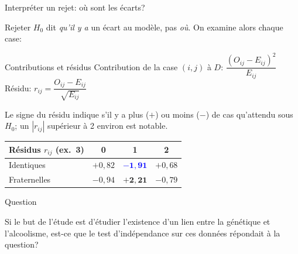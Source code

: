 \documentclass{BeamerTemplate}
\begin{document}
\begin{frame}[t]{Interpréter un rejet: où sont les écarts?}

\small
Rejeter $H_0$ dit \emph{qu'il y a} un écart au modèle, pas \emph{où}. On examine
alors chaque case:

\begin{Boite}{Contributions et résidus}
\alert{Contribution} de la case $(i,j)$ à $D$: $\dfrac{(O_{ij}-E_{ij})^2}{E_{ij}}$
\qquad \alert{Résidu}: $r_{ij}=\dfrac{O_{ij}-E_{ij}}{\sqrt{E_{ij}}}$
\end{Boite}

Le \alert{signe} du résidu indique s'il y a plus ($+$) ou moins ($-$) de cas
qu'attendu sous $H_0$; un $|r_{ij}|$ supérieur à 2 environ est notable.

\vspace{-1mm}
\begin{center}
\renewcommand{\arraystretch}{1.1}
\begin{tabular}{l|ccc}
Résidus $r_{ij}$ (ex.\ 3) & 0 & 1 & 2\\
\hline
Identiques & $+0{,}82$ & \textcolor{blue}{$\mathbf{-1{,}91}$} & $+0{,}68$\\
Fraternelles & $-0{,}94$ & \textcolor{burntorange}{$\mathbf{+2{,}21}$} & $-0{,}79$\\
\end{tabular}
\end{center}

\vspace{-1mm}

\end{frame}

\begin{frame}[t]{Question}

Si le but de l'étude est d'étudier l'existence d'un lien entre la
\alert{génétique} et l'alcoolisme, est-ce que le test d'indépendance sur ces
données répondait à la question?

\vspace{4cm}

\end{frame}
\end{document}
